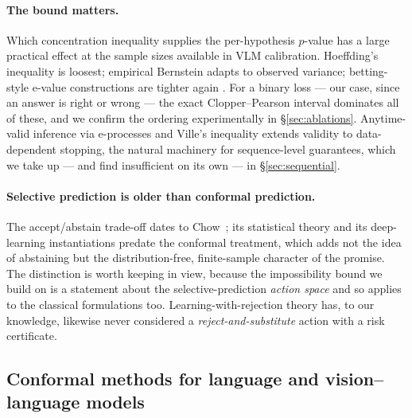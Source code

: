 \documentclass[review,number,doubleblind]{elsarticle}
\theoremstyle{plain}
\theoremstyle{definition}
\theoremstyle{remark}
\begin{document}
\paragraph{The bound matters.}
Which concentration inequality supplies the per-hypothesis $p$-value has a large practical
effect at the sample sizes available in VLM calibration. Hoeffding's inequality is loosest;
empirical Bernstein adapts to observed variance; betting-style e-value constructions are
tighter again \citep{waudbysmith2024}. For a binary loss --- our case, since an answer is
right or wrong --- the exact Clopper--Pearson interval \citep{clopper1934} dominates all of
these, and we confirm the ordering experimentally in \S\ref{sec:ablations}. Anytime-valid
inference via e-processes and Ville's inequality \citep{waudbysmith2024,ramdas2023} extends
validity to data-dependent stopping, the natural machinery for sequence-level guarantees,
which we take up --- and find insufficient on its own --- in \S\ref{sec:sequential}.

\paragraph{Selective prediction is older than conformal prediction.}
The accept/abstain trade-off dates to Chow~\cite{chow1970}; its statistical theory
\citep{elyaniv2010,bartlett2008,cortes2016} and its deep-learning instantiations
\citep{geifman2019} predate the conformal treatment, which adds not the idea of abstaining
but the distribution-free, finite-sample character of the promise. The distinction is worth
keeping in view, because the impossibility bound we build on is a statement about the
selective-prediction \emph{action space} and so applies to the classical formulations too.
Learning-with-rejection theory has, to our knowledge, likewise never considered a
\emph{reject-and-substitute} action with a risk certificate.

\subsection{Conformal methods for language and vision--language models}
\label{sec:rel:conflm}
\end{document}
